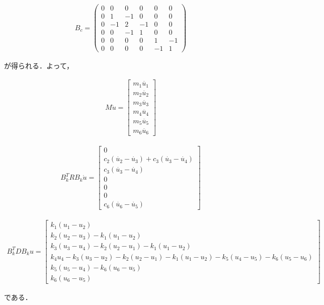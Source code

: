 \begin{eqnarray}
    B_c = 
    \left(\begin{matrix}
        0   & 0   & 0   & 0   & 0  & 0  \\
        0   & 1   & -1  & 0   & 0  & 0  \\
        0   & -1  & 2   & -1  & 0  & 0  \\
        0   & 0   & -1  & 1   & 0  & 0  \\
        0   & 0   & 0   & 0   & 1  & -1 \\
        0   & 0   & 0   & 0   & -1 & 1  
    \end{matrix}\right)
\end{eqnarray}

が得られる．よって，

\begin{eqnarray}
    M\ddot{u} =
    \left[\begin{matrix}
        m_1 \ddot{u_1} \\
        m_2 \ddot{u_2} \\
        m_3 \ddot{u_3} \\
        m_4 \ddot{u_4} \\
        m_5 \ddot{u_5} \\
        m_6 \ddot{u_6} 
    \end{matrix}\right]
\end{eqnarray}

\begin{eqnarray}
    B_k^T R B_k \dot{u} =
    \left[\begin{matrix}
        0 \\
        c_2 (\dot{u_2} - \dot{u_3}) + c_3 (\dot{u_3} - \dot{u_4}) \\
        c_3 (\dot{u_3} - \dot{u_4}) \\
        0 \\
        0 \\
        0 \\
        c_6 (\dot{u_6} - \dot{u_5}) 
    \end{matrix}\right]
\end{eqnarray}

\begin{eqnarray}
    B_k^T D B_k u =
    \left[\begin{matrix}
        k_1 (u_1 - u_2) \\
        k_2 (u_2 - u_3) - k_1 (u_1 - u_2) \\
        k_3 (u_3 - u_4) - k_2 (u_2 - u_1) - k_1 (u_1 - u_2) \\
        k_4 u_4 - k_3 (u_3 - u_2) - k_2 (u_2 - u_1) - k_1 (u_1 - u_2) - k_5 (u_4 - u_5) - k_6 (u_5 - u_6) \\
        k_5 (u_5 - u_4) - k_6 (u_6 - u_5) \\
        k_6 (u_6 - u_5) 
    \end{matrix}\right]
\end{eqnarray}

である．
